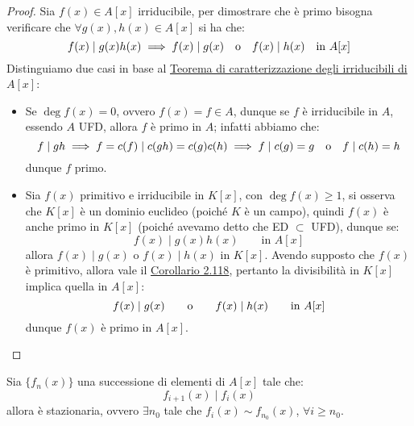 \documentclass[11pt]{scrartcl}
\begin{document}
\begin{proof}
    Sia $f(x) \in A[x]$ irriducibile, per dimostrare che è primo bisogna verificare che $\forall g(x),h(x) \in A[x]$ si ha che:
    \[ f(x) \mid g(x)h(x) \implies f(x) \mid g(x) \quad \text o \quad f(x) \mid h(x) \quad \text{in $A[x]$}
        \]
    Distinguiamo due casi in base al \hyperref[carattirr]{Teorema di caratterizzazione degli irriducibili di $A[x]$}:
    \begin{itemize}
        \item Se $\deg f(x) = 0$, ovvero $f(x) = f \in A$, dunque se $f$ è irriducibile in $A$, essendo $A$ UFD, allora $f$ è primo in $A$;
        infatti abbiamo che:
        \[ f \mid gh \implies f = c(f) \mid c(gh) = c(g)c(h) \implies f \mid c(g) = g \quad \text o \quad f \mid c(h) = h
            \]
        dunque $f$ primo.
        \item Sia $f(x)$ primitivo e irriducibile in $K[x]$, con $\deg f(x) \geq 1$, si osserva che $K[x]$ è un dominio euclideo (poiché $K$ è un campo), quindi $f(x)$ è anche primo
        in $K[x]$ (poiché avevamo detto che ED $\subset$ UFD), dunque se:
        \[ f(x) \mid g(x)h(x) \qquad \text{in $A[x]$}
            \]
        allora $f(x) \mid g(x)$ o $f(x) \mid h(x)$ in $K[x]$. Avendo supposto che $f(x)$ è primitivo, allora vale il \hyperref[2.118]{Corollario 2.118}, pertanto la divisibilità in $K[x]$ implica quella in $A[x]$:
        \[ f(x) \mid g(x) \qquad \text o \qquad f(x) \mid h(x) \qquad \text{in $A[x]$}
            \]
        dunque $f(x)$ è primo in $A[x]$.
    \end{itemize}
\end{proof}

\begin{proposition}
    Sia $\{f_n(x)\}$ una successione di elementi di $A[x]$ tale che:
    \[ f_{i+1}(x) \mid f_i(x)
        \]
    allora è stazionaria, ovvero $\exists n_0$ tale che $f_i(x) \sim f_{n_0}(x)$, $\forall i \geq n_0$.
\end{proposition}
\end{document}
